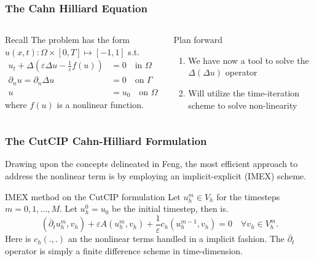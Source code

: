 \begin{frame}
\frametitle{The Cahn Hilliard Equation}
    \begin{columns}
        \begin{column}{0.5\textwidth}
            \begin{block}{Recall}
                The problem has the form $u( x, t): \Omega \times [0,T] \mapsto [-1,1]$ s.t.
                \[
                \begin{split}
                    u_t+\Delta\left(\varepsilon \Delta u-\frac{1}{\varepsilon} f(u)\right)&=0 \quad \text{in } \Omega \\
                    \partial_n u=\partial_n \Delta u& =0 \quad \text{on } \Gamma  \\
                    u & =u_0 \quad \text{on } \Omega
                \end{split}
                \]
                where $f(u)$ is a nonlinear function.
            \end{block}
        \end{column}
        \begin{column}{0.5\textwidth}
            \begin{block}{Plan forward}
                \begin{enumerate}
                    \item We have now a tool to solve the $\Delta ( \Delta u) $ operator
                    \item Will utilize the time-iteration scheme to solve non-linearity
                \end{enumerate}
            \end{block}
        \end{column}
    \end{columns}
\end{frame}


\begin{frame}
\frametitle{The CutCIP Cahn-Hilliard Formulation}


Drawing upon the concepts delineated in Feng\footnotemark[1], the most efficient approach to address the nonlinear term is by employing an implicit-explicit (IMEX) scheme.

\begin{block}{IMEX method on the CutCIP formulation}
    Let $u^{m}_{h} \in V_{h}$ for the timesteps $m=0,1,\ldots,M$. Let $u_{h}^{0} = u_{0}$ be the initial timestep, then is.
\[
(\overline{\partial}  _{t} u_{h}^m, v_h ) + \varepsilon A (u_{h}^{m}, v_h )+\frac{1}{\varepsilon} c_h ( u_{h}^{m-1}, v_h)=0 \quad \forall v_h \in V_h^m .
\]
Here is $c_{h}( . , .) $ an the nonlinear terms handled in a implicit fashion. The $ \overline{\partial}  _{t}$ operator is simply a finite difference scheme in time-dimension.

\end{block}

\end{frame}

